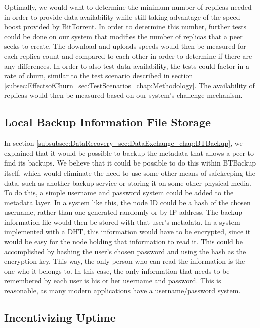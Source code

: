 \documentclass[12pt]{report}
\begin{document}
Optimally, we would want to determine the minimum number of replicas needed in order to provide data availability while still taking advantage of the speed boost provided by BitTorrent. In order to determine this number, further tests could be done on our system that modifies the number of replicas that a peer seeks to create. The download and uploads speeds would then be measured for each replica count and compared to each other in order to determine if there are any differences. In order to also test data availability, the tests could factor in a rate of churn, similar to the test scenario described in section \ref{subsec:EffectsofChurn_sec:TestScenarios_chap:Methodology}. The availability of replicas would then be measured based on our system's challenge mechanism.

\subsection{Local Backup Information File Storage}

In section \ref{subsubsec:DataRecovery_sec:DataExchange_chap:BTBackup}, we explained that it would be possible to backup the metadata that allows a peer to find its backups. We believe that it could be possible to do this within BTBackup itself, which would eliminate the need to use some other means of safekeeping the data, such as another backup service or storing it on some other physical media. To do this, a simple username and password system could be added to the metadata layer. In a system like this, the node ID could be a hash of the chosen username, rather than one generated randomly or by IP address. The backup information file would then be stored with that user's metadata. In a system implemented with a DHT, this information would have to be encrypted, since it would be easy for the node holding that information to read it. This could be accomplished by hashing the user's chosen password and using the hash as the encryption key. This way, the only person who can read the information is the one who it belongs to. In this case, the only information that needs to be remembered by each user is his or her username and password. This is reasonable, as many modern applications have a username/password system.

\subsection{Incentivizing Uptime}
\end{document}
